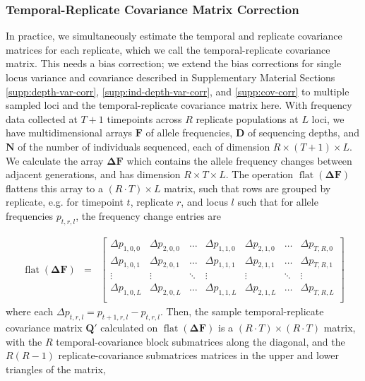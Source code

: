 \documentclass[11pt]{article}
\DeclareMathOperator{\flt}{\mathrm{flat}}
\begin{document}
\subsubsection{Temporal-Replicate Covariance Matrix Correction}
\label{supp:matrix-correction}

In practice, we simultaneously estimate the temporal and replicate covariance
matrices for each replicate, which we call the temporal-replicate covariance
matrix. This needs a bias correction; we extend the bias corrections for single
locus variance and covariance described in Supplementary Material Sections
\ref{supp:depth-var-corr}, \ref{supp:ind-depth-var-corr}, and
\ref{supp:cov-corr} to multiple sampled loci and the temporal-replicate
covariance matrix here. With frequency data collected at $T+1$ timepoints
across $R$ replicate populations at $L$ loci, we have multidimensional arrays
$\mathbf{F}$ of allele frequencies, $\mathbf{D}$ of sequencing depths, and
$\mathbf{N}$ of the number of individuals sequenced, each of dimension $R
\times (T+1) \times L$.  We calculate the array $\mathbf{\Delta F}$ which
contains the allele frequency changes between adjacent generations, and has
dimension $R \times T \times L$.  The operation
$\flt(\mathbf{\Delta}\mathbf{F})$ flattens this array to a $(R \cdot T) \times
L$ matrix, such that rows are grouped by replicate, e.g. for timepoint $t$,
replicate $r$, and locus $l$ such that for allele frequencies $p_{t, r, l}$,
the frequency change entries are 

\begin{align}
    \flt(\mathbf{\Delta F}) &=
                    &\begin{bmatrix} 
    \Delta p_{1, 0, 0} & \Delta p_{2, 0, 0} & \ldots & \Delta p_{1, 1, 0} & \Delta p_{2, 1, 0} & \ldots & \Delta p_{T, R, 0}  \\
    \Delta p_{1, 0, 1} & \Delta p_{2, 0, 1} & \ldots & \Delta p_{1, 1, 1} & \Delta p_{2, 1, 1} & \ldots & \Delta p_{T, R, 1}  \\
    \vdots & \vdots & \ddots & \vdots & \vdots & \ddots & \vdots  \\
    \Delta p_{1, 0, L} & \Delta p_{2, 0, L} & \ldots & \Delta p_{1, 1, L} & \Delta p_{2, 1, L} & \ldots & \Delta p_{T, R, L}  \\
  \end{bmatrix} 
\end{align}
%
where each $\Delta p_{t, r, l} = p_{t+1, r, l} - p_{t, r, l}$. Then, the sample
temporal-replicate covariance matrix $\mathbf{Q}'$ calculated on
$\flt(\mathbf{\Delta F})$ is a $(R \cdot T) \times (R \cdot T)$ matrix, with
the $R$ temporal-covariance block submatrices along the diagonal, and the
$R(R-1)$ replicate-covariance submatrices matrices in the upper and lower
triangles of the matrix,
\end{document}
